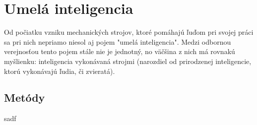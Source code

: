 \section{Umelá inteligencia}\label{sec:ai}

Od počiatku vzniku mechanických strojov, ktoré pomáhajú ľuďom pri svojej práci sa pri nich nepriamo niesol aj pojem
"umelá inteligencia".
Medzi odbornou verejnosťou tento pojem stále nie je jednotný, no väčšina z nich má rovnakú myšlienku:
inteligencia vykonávaná strojmi (narozdiel od prirodzenej inteligencie, ktorú vykonávajú ľudia, či zvieratá).


\subsection{Metódy}\label{subsec:ai-methods}

sadf